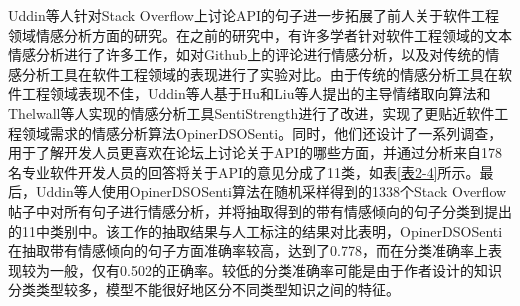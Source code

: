 Uddin等人\cite{DBLP:journals/tse/UddinK21}针对Stack Overflow上讨论API的句子进一步拓展了前人关于软件工程领域情感分析方面的研究。在之前的研究中，有许多学者针对软件工程领域的文本情感分析进行了许多工作，如对Github上的评论进行情感分析\cite{DBLP:conf/kbse/UddinK17}\cite{DBLP:conf/msr/PleteaVS14}\cite{DBLP:conf/msr/GuzmanAL14}\cite{DBLP:conf/sigsoft/GuzmanB13}，以及对传统的情感分析工具在软件工程领域的表现进行了实验对比\cite{DBLP:conf/icsm/JongelingDS15}。由于传统的情感分析工具在软件工程领域表现不佳，Uddin等人基于Hu和Liu等人\cite{DBLP:conf/kdd/HuL04}提出的主导情绪取向算法和Thelwall等人\cite{DBLP:journals/jasis/ThelwallBPCK10}实现的情感分析工具SentiStrength进行了改进，实现了更贴近软件工程领域需求的情感分析算法OpinerDSOSenti。同时，他们还设计了一系列调查，用于了解开发人员更喜欢在论坛上讨论关于API的哪些方面，并通过分析来自178名专业软件开发人员的回答将关于API的意见分成了11类，如表\ref{表2-4}所示。最后，Uddin等人使用OpinerDSOSenti算法在随机采样得到的1338个Stack Overflow帖子中对所有句子进行情感分析，并将抽取得到的带有情感倾向的句子分类到提出的11中类别中。该工作的抽取结果与人工标注的结果对比表明，OpinerDSOSenti在抽取带有情感倾向的句子方面准确率较高，达到了0.778，而在分类准确率上表现较为一般，仅有0.502的正确率。较低的分类准确率可能是由于作者设计的知识分类类型较多，模型不能很好地区分不同类型知识之间的特征。

